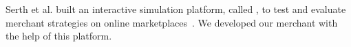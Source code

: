
Serth et al. built an interactive simulation platform, called \pricewars, to test and evaluate merchant strategies on online marketplaces~\cite{DBLP:conf/recsys/0001SPSBLLSU17, edoc2017pricewars}.
We developed our merchant with the help of this platform.


